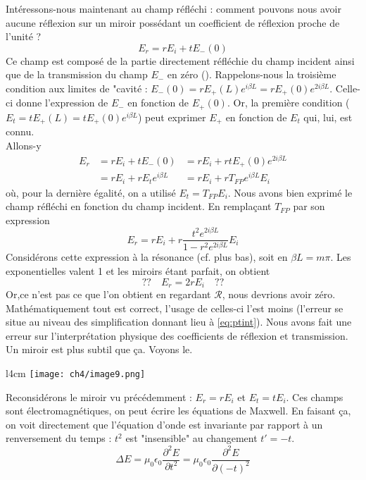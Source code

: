 Intéressons-nous maintenant au champ réfléchi : comment pouvons nous avoir aucune réflexion 
sur un miroir possédant un coefficient de réflexion proche de l'unité ?
\begin{equation}
E_r = rE_i+tE_-(0)
\end{equation}
Ce champ est composé de la partie directement réfléchie du champ incident ainsi que de la 
transmission du champ $E_-$ en zéro (\danger). Rappelons-nous la troisième condition aux 
limites de "cavité : $E_-(0) = rE_+(L)e^{i\beta L} = rE_+(0)e^{2i\beta L}$. Celle-ci donne 
l'expression de $E_-$ en fonction de $E_+(0)$. Or, la première condition ($E_t = tE_+(L) = 
tE_+(0)e^{i\beta L}$) peut exprimer $E_+$ en fonction de $E_t$ qui, lui, est connu.\\

Allons-y
\begin{equation}
\begin{array}{lll}
E_r &= rE_i+tE_-(0) &= rE_i +rtE_+(0)e^{2i\beta L}\\
&= rE_i + rE_te^{i\beta L} &= rE_i+rT_{FP}e^{i\beta L}E_i
\end{array}
\end{equation}
où, pour la dernière égalité, on a utilisé $E_t = T_{FP}E_i$. Nous avons bien exprimé le 
champ réfléchi en fonction du champ incident. En remplaçant $T_{FP}$ par son expression
\begin{equation}
E_r = rE_i + r\frac{t^2e^{2i\beta L}}{1-r^2e^{2i\beta L}}E_i
\end{equation}
Considérons cette expression à la résonance (cf. plus bas), soit en $\beta L = m\pi$. 
Les exponentielles valent 1 et les miroirs étant parfait, on obtient
\begin{equation}
??\quad E_r = 2rE_i\quad ??
\label{eq:ptint}
\end{equation}
Or,ce n'est pas ce que l'on obtient en regardant $\mathcal{R}$, nous devrions avoir zéro. 
Mathématiquement tout est correct, l'usage de celles-ci l'est moins (l'erreur se situe au 
niveau des simplification donnant lieu à \eqref{eq:ptint}). Nous avons fait une 
erreur sur l'interprétation physique des coefficients de réflexion et transmission. Un 
miroir est plus subtil que ça. Voyons le.

\newpage
	\begin{wrapfigure}[6]{l}{4cm}
	\texttt{[image: ch4/image9.png]}
	\end{wrapfigure}
Reconsidérons le miroir vu précédemment : $E_r = rE_i$ et $E_t=tE_i$. Ces champs sont 
électromagnétiques, on peut écrire les équations de Maxwell. En faisant ça, on voit directement 
que l'équation d'onde est invariante par rapport à un renversement du temps : $t^2$ est 
"insensible" au changement $t'=-t$.
\begin{equation}
\Delta E = \mu_0\epsilon_0\dfrac{\partial^2E}{\partial t^2} = \mu_0\epsilon_0\dfrac{\partial^2 E}{
\partial (-t)^2}
\end{equation}

